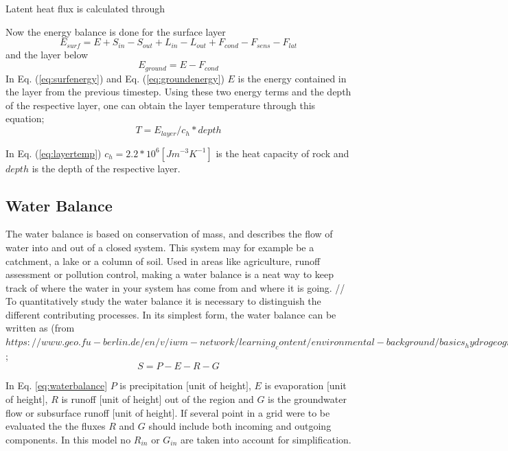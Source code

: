 \documentclass[a4paper,11pt,twocolumn]{article}
\begin{document}
Latent heat flux is calculated through 



Now the energy balance is done for the surface layer  
\begin{equation}
	E_{surf} = E + S_{in}-S_{out}+L_{in}-L_{out}+F_{cond}-F_{sens}-F_{lat}
	\label{eq:surfenergy}
\end{equation}
and the layer below
\begin{equation}
E_{ground} = E-F_{cond}
	\label{eq:groundenergy}
\end{equation}
In Eq. (\ref{eq:surfenergy}) and Eq. (\ref{eq:groundenergy}) $E$ is the energy contained in the layer from the previous timestep. Using these two energy terms and the depth of the respective layer, one can obtain the layer temperature through this equation;
\begin{equation}
	T = E_{layer}/c_h*depth
	\label{eq:layertemp}
\end{equation}

In Eq. (\ref{eq:layertemp}) $c_h = 2.2*10^6 [Jm^{-3}K^{-1}]$ is the heat capacity of rock and $depth$ is the depth of the respective layer.   


\subsection{Water Balance}
The water balance is based on conservation of mass, and describes the flow of water into and out of a closed system. This system may for example be a catchment, a lake or a column of soil. Used in areas like agriculture, runoff assessment or pollution control, making a water balance is a neat way to keep track of where the water in your system has come from and where it is going.  
//
To quantitatively study the water balance it is necessary to distinguish the different contributing processes. In its simplest form, the water balance can be written as (from$ https://www.geo.fu-berlin.de/en/v/iwm-network/learning_content/environmental-background/basics_hydrogeography/water_balance/index.html)$;
\begin{equation}
	S = P - E - R - G 
	\label{eq:waterbalance}
\end{equation}

In Eq. \ref{eq:waterbalance} $P$ is precipitation $[$unit of height$]$, $E$ is evaporation $[$unit of height$]$, $R$ is runoff $[$unit of height$]$ out of the region and $G$ is the groundwater flow or subsurface runoff $[$unit of height$]$. If several point in a grid were to be evaluated the the fluxes $R$ and $G$ should include both incoming and outgoing components. In this model no $R_{in}$ or $G_{in}$ are taken into account for simplification.   
\end{document}
